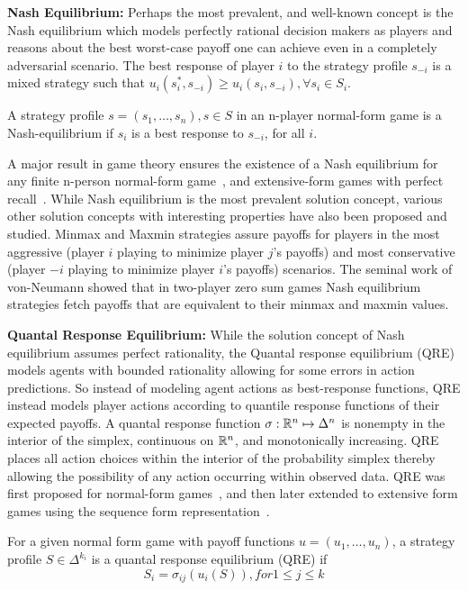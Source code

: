 \textbf{Nash Equilibrium:}
Perhaps the most prevalent, and well-known concept is the Nash equilibrium which models perfectly
rational decision makers as players and reasons about the best worst-case payoff one can achieve
even in a completely adversarial scenario.
The best response of player $i$ to the strategy profile $s_{-i}$ is a mixed strategy such that
$u_i(s_i^\ast, s_{-i}) \geq u_i(s_i, s_{-i}), \forall s_i \in S_i$.

\begin{definition}
	A strategy profile $s=(s_1, \dots, s_n), s \in S$ in an n-player normal-form game is a Nash-equilibrium if $s_i$ is a best response to $s_{-i}$, for all
	$i$.
\end{definition}

A major result in game theory ensures the existence of a Nash equilibrium for any finite n-person
normal-form game~\cite{nashEquilibrium1950}, and extensive-form games with perfect
recall~\cite{kuhnExtensive1950}.
While Nash equilibrium is the most prevalent solution concept, various other solution concepts with
interesting properties have also been proposed and studied.
Minmax and Maxmin strategies assure payoffs for players in the most aggressive (player $i$ playing
to minimize player $j$'s payoffs) and most conservative (player $-i$ playing to minimize player
$i$'s payoffs) scenarios.
The seminal work of von-Neumann showed that in two-player zero sum games Nash equilibrium
strategies fetch payoffs that are equivalent to their minmax and maxmin values.

\textbf{Quantal Response Equilibrium:}
While the solution concept of Nash equilibrium assumes perfect rationality, the Quantal response
equilibrium (QRE) models agents with bounded rationality allowing for some errors in action
predictions.
So instead of modeling agent actions as best-response functions, QRE instead models player actions
according to quantile response functions of their expected payoffs.
A quantal response function $\sigma: \mathbb{R}^n \mapsto \Delta^n$ is nonempty in the interior of the
simplex, continuous on $\mathbb{R}^n$, and monotonically increasing.
QRE places all action choices within the interior of the probability simplex thereby allowing the
possibility of any action occurring within observed data.
QRE was first proposed for normal-form games~\cite{mckelveyQuantal1995}, and then later extended to
extensive form games using the sequence form representation~\cite{mckelveyQuantal1998}.

\begin{definition}
	For a given normal form game with payoff functions $u=(u_1,\dots, u_n)$, a strategy profile $S \in \Delta^{k_i}$ is
	a quantal response equilibrium (QRE) if
	$$ S_i = \sigma_{ij}(u_i(S)), for 1 \leq j \leq k$$

\end{definition}

